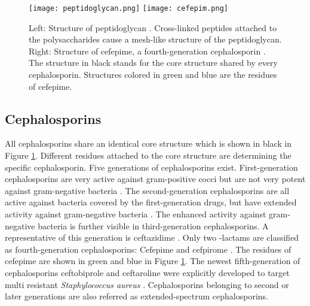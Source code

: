\begin{figure}
	\texttt{[image: peptidoglycan.png]}
	\texttt{[image: cefepim.png]}
	\caption{Left: Structure of peptidoglycan \cite{noauthor_bacteria:_nodate}. Cross-linked peptides attached to the polysaccharides cause a mesh-like structure of the peptidoglycan. Right: Structure of cefepime, a fourth-generation cephalosporin \cite{noauthor_datei:cefepim_nodate}. The structure in black stands for the core structure shared by every cephalosporin. Structures colored in green and blue are the residues of cefepime.}
	\label{figure:cefepim}
\end{figure}

\subsection{Cephalosporins}
All cephalosporins share an identical core structure which is shown in black in Figure \ref{figure:cefepim}. Different residues attached to the core structure are determining the specific cephalosporin. Five generations of cephalosporins exist.
First-generation cephalosporins are very active against gram-positive cocci but are not very potent against gram-negative bacteria \cite{fernandes_-lactams:_2013}. The second-generation cephalosporins are all active against bacteria covered by the first-generation drugs, but have extended activity against gram-negative bacteria \cite{fernandes_-lactams:_2013}. The enhanced activity against gram-negative bacteria is further visible in third-generation cephalosporins. A representative of this generation is ceftazidime \cite{klein_third-generation_1995}. Only two \textbeta-lactams are classified as fourth-generation cephalosporins: Cefepime and cefpirome \cite{fernandes_-lactams:_2013}. The residues of cefepime are shown in green and blue in Figure \ref{figure:cefepim}. The newest fifth-generation of cephalosporins ceftobiprole and ceftaroline  were explicitly developed to target multi resistant \textit{Staphylococcus aureus} \cite{fernandes_-lactams:_2013}. Cephalosporins belonging to second or later generations are also referred as extended-spectrum cephalosporins.

